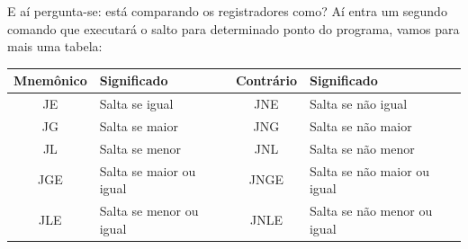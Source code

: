 E aí pergunta-se: está comparando os registradores como? Aí entra um segundo comando que executará o salto para determinado ponto do programa, vamos para mais uma tabela:
\begin{table}[H]
	\centering 
	\begin{tabular}{c | l | c | l }
		\textbf{Mnemônico} & \textbf{Significado} & \textbf{Contrário} & \textbf{Significado} \\ \hline
		JE & Salta se igual & JNE & Salta se não igual \\
		JG & Salta se maior & JNG & Salta se não maior \\
		JL & Salta se menor & JNL & Salta se não menor \\
		JGE & Salta se maior ou igual & JNGE & Salta se não maior ou igual \\
		JLE & Salta se menor ou igual & JNLE & Salta se não menor ou igual \\
	\end{tabular}
\end{table}

